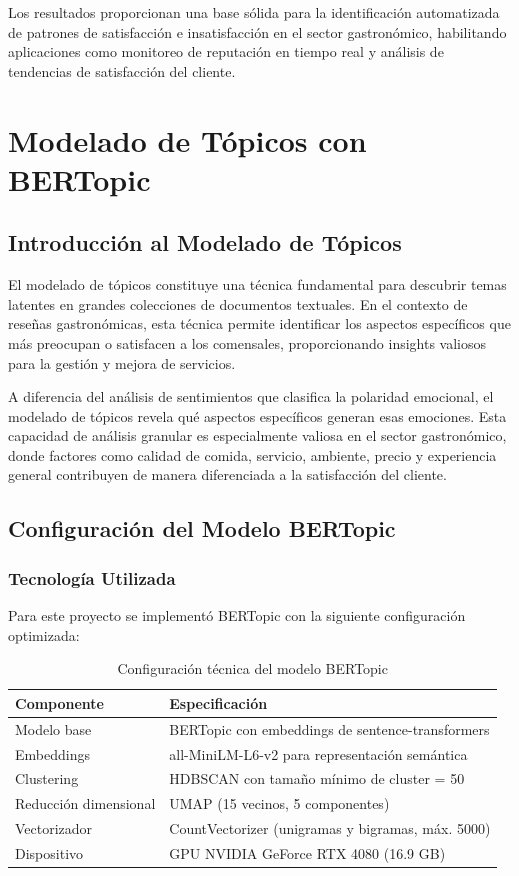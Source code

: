 \documentclass[12pt,a4paper,twoside,openany]{book}
\begin{document}
Los resultados proporcionan una base sólida para la identificación automatizada de patrones de satisfacción e insatisfacción en el sector gastronómico, habilitando aplicaciones como monitoreo de reputación en tiempo real y análisis de tendencias de satisfacción del cliente.

\chapter{Modelado de Tópicos con BERTopic}

\section{Introducción al Modelado de Tópicos}

El modelado de tópicos constituye una técnica fundamental para descubrir temas latentes en grandes colecciones de documentos textuales. En el contexto de reseñas gastronómicas, esta técnica permite identificar los aspectos específicos que más preocupan o satisfacen a los comensales, proporcionando insights valiosos para la gestión y mejora de servicios.

A diferencia del análisis de sentimientos que clasifica la polaridad emocional, el modelado de tópicos revela qué aspectos específicos generan esas emociones. Esta capacidad de análisis granular es especialmente valiosa en el sector gastronómico, donde factores como calidad de comida, servicio, ambiente, precio y experiencia general contribuyen de manera diferenciada a la satisfacción del cliente.

\section{Configuración del Modelo BERTopic}

\subsection{Tecnología Utilizada}

Para este proyecto se implementó BERTopic con la siguiente configuración optimizada:

\begin{table}[H]
\centering
\caption{Configuración técnica del modelo BERTopic}
\begin{tabular}{@{}ll@{}}
\toprule
\textbf{Componente} & \textbf{Especificación} \\
\midrule
Modelo base & BERTopic con embeddings de sentence-transformers \\
Embeddings & all-MiniLM-L6-v2 para representación semántica \\
Clustering & HDBSCAN con tamaño mínimo de cluster = 50 \\
Reducción dimensional & UMAP (15 vecinos, 5 componentes) \\
Vectorizador & CountVectorizer (unigramas y bigramas, máx. 5000) \\
Dispositivo & GPU NVIDIA GeForce RTX 4080 (16.9 GB) \\
\bottomrule
\end{tabular}
\end{table}
\end{document}

